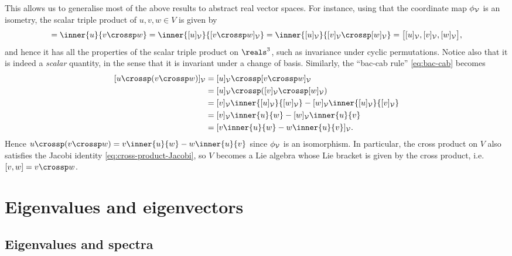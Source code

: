 \documentclass[a4paper, 11pt]{memoir}
\theoremstyle{plaincustomnumber}
\theoremstyle{changedotbreakcustomnumber}
\newcommand{\calV}{\mathcal{V}}
\begin{document}
This allows us to generalise most of the above results to abstract real vector spaces. For instance, using that the coordinate map $\coordmap{\calV}$ is an isometry, the scalar triple product of $u,v,w \in V$ is given by
%
\begin{equation*}
    [u,v,w]
        = \inner{u}{v \crossp w}
        = \inner{\coordvec{u}{\calV}}{\coordvec{v \crossp w}{\calV}}
        = \inner{\coordvec{u}{\calV}}{\coordvec{v}{\calV} \crossp \coordvec{w}{\calV}}
        = \bigl[ \coordvec{u}{\calV}, \coordvec{v}{\calV}, \coordvec{w}{\calV} \bigr],
\end{equation*}
%
and hence it has all the properties of the scalar triple product on $\reals^3$, such as invariance under cyclic permutations. Notice also that it is indeed a \emph{scalar} quantity, in the sense that it is invariant under a change of basis. Similarly, the \enquote{bac-cab rule} \cref{eq:bac-cab} becomes
%
\begin{align*}
    \coordvec{u \crossp (v \crossp w)}{\calV}
        &= \coordvec{u}{\calV} \crossp \coordvec{v \crossp w}{\calV} \\
        &= \coordvec{u}{\calV} \crossp (\coordvec{v}{\calV} \crossp \coordvec{w}{\calV}) \\
        &= \coordvec{v}{\calV} \inner{\coordvec{u}{\calV}}{\coordvec{w}{\calV}} - \coordvec{w}{\calV} \inner{\coordvec{u}{\calV}}{\coordvec{v}{\calV}} \\
        &= \coordvec{v}{\calV} \inner{u}{w} - \coordvec{w}{\calV} \inner{u}{v} \\
        &= \coordvec{ v \inner{u}{w} - w \inner{u}{v} }{\calV}.
\end{align*}
%
Hence $u \crossp (v \crossp w) = v \inner{u}{w} - w \inner{u}{v}$ since $\coordmap{\calV}$ is an isomorphism. In particular, the cross product on $V$ also satisfies the Jacobi identity \cref{eq:cross-product-Jacobi}, so $V$ becomes a Lie algebra whose Lie bracket is given by the cross product, i.e. $[v,w] = v \crossp w$.


\chapter{Eigenvalues and eigenvectors}

\section{Eigenvalues and spectra}

\newcommand{\geo}{\mathrm{Geo}}
\end{document}
